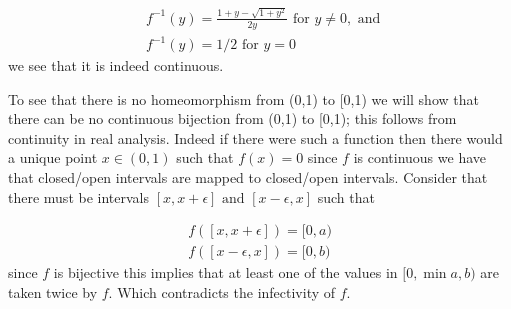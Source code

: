 \documentclass[11pt, oneside]{article}   	%
\newcommand{\tand}{\text{ and }}
\newcommand{\tfor}{\text{ for }}
\begin{document}
\begin{eqnarray*}
&f^{-1}(y) = \frac{1+y -\sqrt{1+y^2}}{2y} \tfor y \neq 0, \tand \\
&f^{-1}(y) = 1/2 \tfor y = 0
\end{eqnarray*}
we see that it is indeed continuous.

To see that there is no homeomorphism from (0,1) to [0,1) we will show that there can be no continuous bijection from (0,1) to [0,1); this follows from continuity in real analysis. Indeed if there were such a function then there would a unique point $x \in (0,1)$ such that $f(x) = 0$ since $f$ is continuous we have that closed/open intervals are mapped to closed/open intervals. Consider that there must be intervals $[x,x+\epsilon] \tand [x-\epsilon, x]$ such that

\begin{eqnarray*}
f([x,x+\epsilon]) = [0,a) \\
f([x-\epsilon, x]) = [0,b)
\end{eqnarray*}
since $f$ is bijective this implies that at least one of the values in $[0,\min{a,b})$ are taken twice by $f$. Which contradicts the infectivity of $f$.
 
\end{document}
